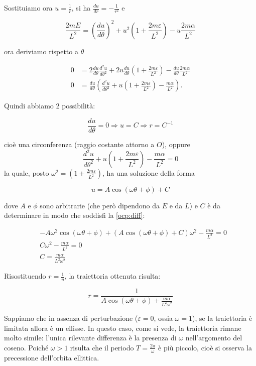 \documentclass[../main.tex]{subfiles}
\begin{document}
Sostituiamo ora $u=\frac{1}{r}$, si ha $\frac{du}{dr}=-\frac{1}{r^2}$ e

\[
 \frac{2mE}{L^2}=\left(\frac{du}{d\theta}\right)^2+u^2\left(1+\frac{2m\varepsilon}{L^2}\right)-u\frac{2m\alpha}{L^2}
\]

ora deriviamo rispetto a $\theta$

\begin{align*}
 0&=2\frac{du}{d\theta}\frac{d^2u}{d\theta^2}+2u\frac{du}{d\theta}\left(1+\frac{2m\varepsilon}{L^2}\right)-\frac{du}{d\theta}\frac{2m\alpha}{L^2}\\
 0&=\frac{du}{d\theta}\left(\frac{d^2u}{d\theta^2}+u\left(1+\frac{2m\varepsilon}{L^2}\right)-\frac{m\alpha}{L^2}\right).
\end{align*}

Quindi abbiamo 2 possibilità:

\[
 \frac{du}{d\theta}=0 \Rightarrow u = C \Rightarrow r = C^{-1}
\]

cioè una circonferenza (raggio costante attorno a $O$), oppure
\begin{equation}
  \label{ocp:diff}
 \frac{d^2u}{d\theta^2}+u\left(1+\frac{2m\varepsilon}{L^2}\right)-\frac{m\alpha}{L^2}=0
\end{equation}
la quale, posto $\omega^2=\left(1+\frac{2m\varepsilon}{L^2}\right)$, ha una soluzione della forma

\[
 u = A\cos(\omega\theta+\phi) + C
\]

dove $A$ e $\phi$ sono arbitrarie (che però dipendono da $E$ e da $L$) e $C$ è da determinare in modo che soddisfi la \cref{ocp:diff}:

\begin{align}
  &-A\omega^2\cos(\omega\theta+\phi)+(A\cos(\omega\theta+\phi) + C)\omega^2-\frac{m\alpha}{L^2}=0 \\
  &C\omega^2-\frac{m\alpha}{L^2}=0 \\
  &C=\frac{m\alpha}{L^2\omega^2}
\end{align}

Risostituendo $r=\frac{1}{u}$, la traiettoria ottenuta risulta:

\[
 r=\frac{1}{A\cos(\omega\theta+\phi) + \frac{m\alpha}{L^2\omega^2}}
\]

Sappiamo che in assenza di perturbazione ($\varepsilon=0$, ossia $\omega=1$), se la traiettoria è limitata allora è un ellisse.
In questo caso, come si vede, la traiettoria rimane molto simile: l'unica rilevante differenza è la presenza di $\omega$ nell'argomento del coseno.
Poiché $\omega>1$ risulta che il periodo $T=\frac{2\pi}{\omega}$ è più piccolo, cioè si osserva la precessione dell'orbita ellittica.
\end{document}
